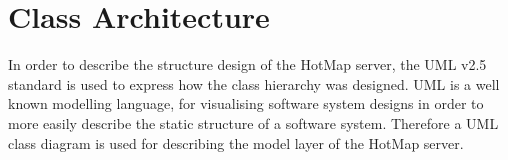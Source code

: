 \section{Class Architecture}

In order to describe the structure design of the HotMap server, the UML v2.5 standard is used to express how the class hierarchy was designed. UML is a well known modelling language, for visualising software system designs in order to more easily describe the static structure of a software system.
Therefore a UML class diagram is used for describing the model layer of the HotMap server.





